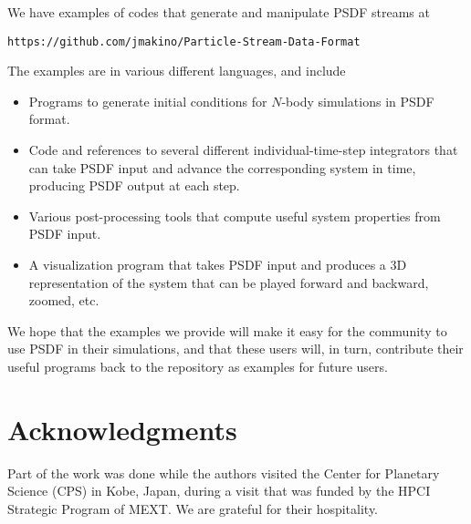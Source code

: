 \documentclass[5p,authoryear]{elsarticle}
\begin{document}
We have examples of codes that generate and manipulate PSDF streams at 
\begin{verbatim}
https://github.com/jmakino/Particle-Stream-Data-Format
\end{verbatim}
The examples are in various different languages, and include
\begin{itemize}
\item Programs to generate initial conditions for $N$-body simulations
  in PSDF format.
\item Code and references to several different individual-time-step
  integrators that can take PSDF input and advance the corresponding
  system in time, producing PSDF output at each step.
\item Various post-processing tools that compute useful system
  properties from PSDF input.
\item A visualization program that takes PSDF input and produces a 3D
  representation of the system that can be played forward and
  backward, zoomed, etc.
\end{itemize}
We hope that the examples we provide will make it easy for the
community to use PSDF in their simulations, and that these users will,
in turn, contribute their useful programs back to the repository as
examples for future users.

\section*{Acknowledgments}
Part of the work was done while the authors visited the Center for
Planetary Science (CPS) in Kobe, Japan, during a visit that was funded
by the HPCI Strategic Program of MEXT.  We are grateful for their
hospitality.



\end{document}

